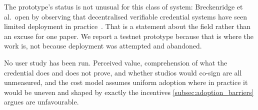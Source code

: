 The prototype's status is not unusual for this class of system: Breckenridge et al.\ open
by observing that decentralised verifiable credential systems have seen limited deployment
in practice~\cite{breckenridge2026picreds}. That is a statement about the field rather than
an excuse for one paper. We report a testnet prototype because that is where the work is,
not because deployment was attempted and abandoned.

No user study has been run. Perceived value, comprehension of what the credential
does and does not prove, and whether studios would co-sign are all unmeasured, and
the cost model assumes uniform adoption where in practice it would be uneven and
shaped by exactly the incentives \cref{subsec:adoption_barriers} argues are
unfavourable.
